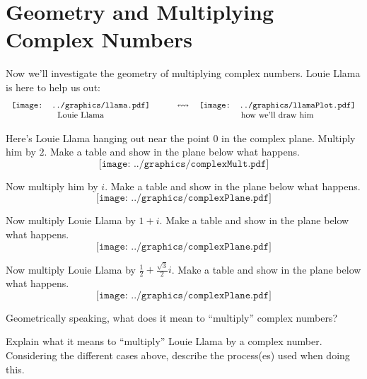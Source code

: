 \newpage
\section{Geometry and Multiplying Complex Numbers}\label{A:complexMultiplication}


Now we'll investigate the geometry of multiplying complex
numbers. Louie Llama is here to help us out:
\[
\begin{tabular}{ccc}
\texttt{[image: ../graphics/llama.pdf]} & \qquad $\leftrightsquigarrow$\qquad& \texttt{[image: ../graphics/llamaPlot.pdf]}\\
Louie Llama & & how we'll draw him
\end{tabular}
\]

\begin{prob} 
Here's Louie Llama hanging out near the point $0$ in the complex
plane. Multiply him by $2$. Make a table and show in the plane below what happens.
\[
\texttt{[image: ../graphics/complexMult.pdf]}
\]
\end{prob}

\break

\begin{prob} 
Now multiply him by $i$. Make a table and show in the plane below what happens.
\[
\texttt{[image: ../graphics/complexPlane.pdf]}
\]
\end{prob}

\vfill

\begin{prob} 
Now multiply Louie Llama by $1+i$. Make a table and show in the plane
below what happens.
\[
\texttt{[image: ../graphics/complexPlane.pdf]}
\]
\end{prob}

\vfill



\begin{prob} 
Now multiply Louie Llama by $\frac{1}{2}+\frac{\sqrt{3}}{2}i$. Make a
table and show in the plane below what happens.
\[
\texttt{[image: ../graphics/complexPlane.pdf]}
\]
\end{prob}


\begin{prob} 
Geometrically speaking, what does it mean to ``multiply'' complex
numbers?
\end{prob}




\begin{prob}
Explain what it means to ``multiply'' Louie Llama by a complex
number. Considering the different cases above, describe the
process(es) used when doing this.
\end{prob}
